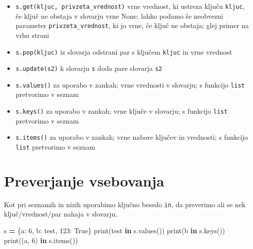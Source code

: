 \documentclass[
]{report}
\newenvironment{Shaded}{\begin{snugshade}}{\end{snugshade}}
\newcommand{\BuiltInTok}[1]{#1}
\newcommand{\DecValTok}[1]{\textcolor[rgb]{0.00,0.00,0.81}{#1}}
\newcommand{\KeywordTok}[1]{\textcolor[rgb]{0.13,0.29,0.53}{\textbf{#1}}}
\newcommand{\NormalTok}[1]{#1}
\newcommand{\OperatorTok}[1]{\textcolor[rgb]{0.81,0.36,0.00}{\textbf{#1}}}
\newcommand{\StringTok}[1]{\textcolor[rgb]{0.31,0.60,0.02}{#1}}
\newcommand{\VariableTok}[1]{\textcolor[rgb]{0.00,0.00,0.00}{#1}}
\providecommand{\tightlist}{%
  \setlength{\itemsep}{0pt}\setlength{\parskip}{0pt}}
\begin{document}
\begin{itemize}
\tightlist
\item
  \texttt{s.get(kljuc,\ privzeta\_vrednost)} vrne vrednost, ki ustreza ključu \texttt{kljuc}, če ključ ne obstaja v slovarju vrne None; lahko podamo še neobvezni parameter \texttt{privzeta\_vrednost}, ki jo vrne, če ključ ne obstaja; glej primer na vrhu strani
\item
  \texttt{s.pop(kljuc)} iz slovarja odstrani par s ključem \texttt{kljuc} in vrne vrednost
\item
  \texttt{s.update(s2)} k slovarju \texttt{s} doda pare slovarja \texttt{s2}
\item
  \texttt{s.values()} za uporabo v zankah; vrne vrednosti v slovarju; s funkcijo \texttt{list} pretvorimo v seznam
\item
  \texttt{s.keys()} za uporabo v zankah; vrne ključe v slovarju; s funkcijo \texttt{list} pretvorimo v seznam
\item
  \texttt{s.items()} za uporabo v zankah; vrne nabore ključev in vrednosti; s funkcijo \texttt{list} pretvorimo v seznam
\end{itemize}

\hypertarget{preverjanje-vsebovanja-1}{%
\section{Preverjanje vsebovanja}\label{preverjanje-vsebovanja-1}}

Kot pri seznamih in nizih uporabimo ključno besedo \texttt{in}, da preverimo ali se nek ključ/vrednost/par nahaja v slovarju.

\begin{Shaded}
\begin{Highlighting}[]
\NormalTok{s }\OperatorTok{=}\NormalTok{ \{}\StringTok{\textquotesingle{}a\textquotesingle{}}\NormalTok{: }\DecValTok{6}\NormalTok{, }\StringTok{\textquotesingle{}b\textquotesingle{}}\NormalTok{: }\StringTok{\textquotesingle{}test\textquotesingle{}}\NormalTok{, }\DecValTok{123}\NormalTok{: }\VariableTok{True}\NormalTok{\}}
\BuiltInTok{print}\NormalTok{(}\StringTok{\textquotesingle{}test\textquotesingle{}} \KeywordTok{in}\NormalTok{ s.values())}
\BuiltInTok{print}\NormalTok{(}\StringTok{\textquotesingle{}b\textquotesingle{}} \KeywordTok{in}\NormalTok{ s.keys())}
\BuiltInTok{print}\NormalTok{((}\StringTok{\textquotesingle{}a\textquotesingle{}}\NormalTok{, }\DecValTok{6}\NormalTok{) }\KeywordTok{in}\NormalTok{ s.items())}
\end{Highlighting}
\end{Shaded}
\end{document}
